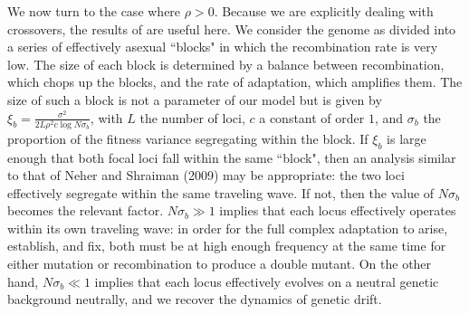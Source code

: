 \documentclass[rmp]{revtex4}
\begin{document}
We now turn to the case where $\rho > 0$.
Because we are explicitly dealing with crossovers, the results of \citet{neher_kessinger_2013} are useful here.
We consider the genome as divided into a series of effectively asexual ``blocks" in which the recombination rate is very low.
The size of each block is determined by a balance between recombination, which chops up the blocks, and the rate of adaptation, which amplifies them.
The size of such a block is not a parameter of our model but is given by $\xi_b = \frac{\sigma^2}{2L\rho^2 c \log N\sigma_b}$, with $L$ the number of loci, $c$ a constant of order $1$, and $\sigma_b$ the proportion of the fitness variance segregating within the block.
If $\xi_b$ is large enough that both focal loci fall within the same ``block", then an analysis similar to that of Neher and Shraiman (2009) may be appropriate: the two loci effectively segregate within the same traveling wave.
If not, then the value of $N\sigma_b$ becomes the relevant factor.
$N\sigma_b \gg 1$ implies that each locus effectively operates within its own traveling wave: in order for the full complex adaptation to arise, establish, and fix, both must be at high enough frequency at the same time for either mutation or recombination to produce a double mutant.
On the other hand, $N\sigma_b \ll 1$ implies that each locus effectively evolves on a neutral genetic background neutrally, and we recover the dynamics of genetic drift.
\fi



\end{document}
